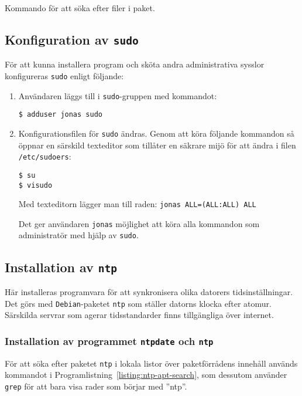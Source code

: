 \begin{listing}[H]
\caption{Kommando för att söka efter filer i paket.}
\label{listing:dpkg-search}
\end{listing}


\subsection{Konfiguration av \texttt{sudo}}
För att kunna installera program och sköta andra administrativa sysslor
konfigureras \texttt{sudo} enligt följande:

\begin{enumerate}
  \item Användaren läggs till i \texttt{sudo}-gruppen med kommandot:

        \texttt{\$ adduser jonas sudo}

  \item Konfigurationsfilen för \texttt{sudo} ändras. Genom att köra
        följande kommandon så öppnar en särskild texteditor som tillåter en
        säkrare mijö för att ändra i filen \texttt{/etc/sudoers}:
        
        \texttt{\$ su} \\
        \texttt{\$ visudo}

        Med texteditorn lägger man till raden:
        \texttt{jonas ALL=(ALL:ALL) ALL}

        Det ger användaren \texttt{jonas} möjlighet att köra alla kommandon som 
        administratör med hjälp av \texttt{sudo}.
\end{enumerate}






\subsection{Installation av \texttt{ntp}}
Här installeras programvara för att synkronisera olika datorers
tidsinställningar.  Det görs med \texttt{Debian}-paketet \texttt{ntp} som
ställer datorns klocka efter atomur. Särskilda servrar som agerar
tidsstandarder finns tillgängliga över internet.

\subsubsection{Installation av programmet \texttt{ntpdate} och \texttt{ntp}}
För att söka efter paketet \texttt{ntp} i lokala listor över paketförrådens
innehåll används kommandot i Programlistning~\ref{listing:ntp-apt-search},
som dessutom använder \texttt{grep} för att bara visa rader som börjar med
''ntp''.

